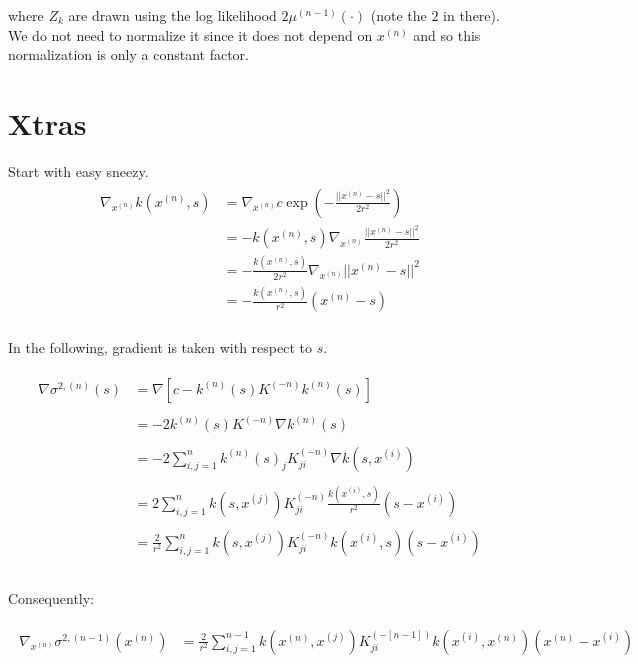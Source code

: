 \documentclass[paper=a4, fontsize=11pt]{scrartcl} %
\numberwithin{equation}{section} %
\numberwithin{figure}{section} %
\numberwithin{table}{section} %
\newcommand{\gxn}{\nabla_{x^{(n)}}} %
\newcommand{\xn}{x^{(n)}}
\newcommand{\xii}{x^{(i)}}
\newcommand{\xj}{x^{(j)}}
\newcommand{\kn}{k^{(n)}}
\newcommand{\Kinvn}{K^{(-n)}} %
\newcommand{\Kinvnm}{K^{(-[n-1])}}
\newcommand{\sqn}{\sigma ^{2 , (n)}     }
\newcommand{\signxn}{\sigma^{2, (n-1)} (\xn)}
\begin{document}
where $Z_k$ are drawn using the log likelihood $2\mu^{(n-1)}(\cdot)$ (note the $2$ in there). We do not need to normalize it since it does not depend 
on $x^{(n)}$ and so this normalization is only a constant factor.


\section{Xtras}
Start with easy sneezy.
\begin{align}
 \begin{split}
  \gxn k(\xn,s) &= \gxn c\exp(-\frac{||\xn - s||^2}{2r^2} )\\
%
&= -k(\xn,s) \gxn\frac{||\xn - s||^2}{2r^2} \\
%
&= -\frac{k(\xn,s)}{2r^2} \gxn||\xn - s||^2 \\
%
&= -\frac{k(\xn ,s)}{r^2} (\xn-s)\\
 \end{split}
\end{align}

In the following, gradient is taken with respect to $s$.

\begin{align}
 \begin{split}
  \nabla \sqn (s) &= \nabla [ c - \kn(s) \Kinvn \kn(s)]\\\\
%
%
%
&= -2 \kn(s) \Kinvn \nabla\kn(s)\\\\
%
%
%
&= -2 \sum_{i,j=1}^{n} \kn(s)_j \Kinvn_{ji} \nabla k (s, \xii )\\\\
%
%
%
&= 2 \sum_{i,j=1}^{n} k(s,\xj) \Kinvn_{ji} \frac{k(\xii ,s)}{r^2} (s-\xii)\\\\
%
%
%
&= \frac{2}{r^2} \sum_{i,j=1}^{n} k(s,\xj) \Kinvn_{ji} k(\xii ,s) (s-\xii)\\\\
 \end{split}
\end{align}

Consequently:

\begin{align}
 \begin{split}
  \gxn \signxn &= \frac{2}{r^2} \sum_{i,j=1}^{n-1} k(\xn,\xj) \Kinvnm_{ji} k(\xii ,\xn) (\xn-\xii)\\\\
 \end{split}
\end{align}
\end{document}
